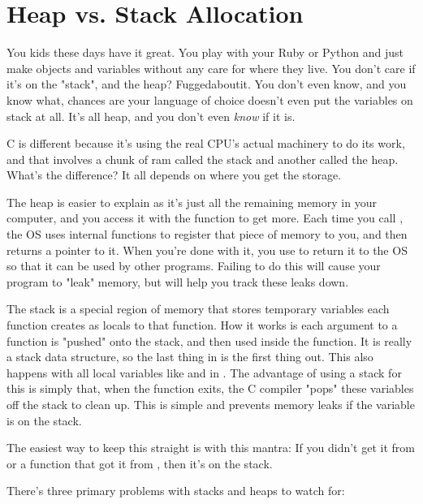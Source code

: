 \section{Heap vs. Stack Allocation}

You kids these days have it great.  You play with your Ruby or Python and 
just make objects and variables without any care for where they live.  You
don't care if it's on the "stack", and the heap?  Fuggedaboutit.  You don't
even know, and you know what, chances are your language of choice doesn't
even put the variables on stack at all.  It's all heap, and you don't even
\emph{know} if it is.

C is different because it's using the real CPU's actual machinery to do its
work, and that involves a chunk of ram called the stack and another 
called the heap.  What's the difference?  It all depends on where you
get the storage.

The heap is easier to explain as it's just all the remaining memory in
your computer, and you access it with the function  to
get more.  Each time you call , the OS uses internal 
functions to register that piece of memory to you, and then returns
a pointer to it.  When you're done with it, you use  to
return it to the OS so that it can be used by other programs.  Failing
to do this will cause your program to "leak" memory, but 
will help you track these leaks down.

The stack is a special region of memory that stores temporary variables each
function creates as locals to that function.  How it works is each argument to
a function is "pushed" onto the stack, and then used inside the function.  It
is really a stack data structure, so the last thing in is the first thing out.
This also happens with all local variables like  and
 in .  The advantage of using a stack for this is
simply that, when the function exits, the C compiler "pops" these variables off
the stack to clean up.  This is simple and prevents memory leaks if the
variable is on the stack.

The easiest way to keep this straight is with this mantra:  If you
didn't get it from  or a function that got it from ,
then it's on the stack.

There's three primary problems with stacks and heaps to watch for:

